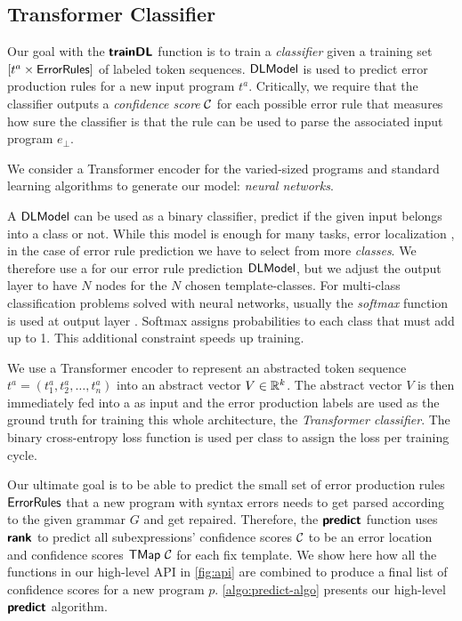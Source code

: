 \subsection{Transformer Classifier}
\label{sec:seq-classifiers:location-rank}

Our goal with the $\bm{\mathsf{trainDL}}$ function is to train a \emph{classifier} given a
training set $[t^a \times \mathsf{ErrorRules}]$ of labeled token sequences.
$\mathsf{DLModel}$ is used to predict error production rules for a new input program
$t^a$. Critically, we require that the classifier outputs a \emph{confidence
score} $\mathcal{C}$ for each possible error rule that measures how sure the
classifier is that the rule can be used to parse the associated input program
$e_{\bot}$.

We consider a Transformer encoder for the varied-sized programs and standard
learning algorithms to generate our model: \emph{neural networks}.

%
A \dnn $\mathsf{DLModel}$ can be used as a binary classifier, \ie predict if the given
input belongs into a class or not. While this model is enough for many tasks,
\eg error localization \citep{Sakkas_2020}, in the case of error rule prediction
we have to select from more \emph{classes}. We therefore use a \dnn for our
error rule prediction $\mathsf{DLModel}$, but we adjust the output layer to have $N$ nodes
for the $N$ chosen template-classes. For multi-class classification problems
solved with neural networks, usually the \emph{softmax} function is used at
output layer \citep{Goodfellow-et-al-2016, Bishop-book-2006}. Softmax assigns
probabilities to each class that must add up to 1. This additional constraint
speeds up training.

%
We use a Transformer encoder to represent an abstracted token sequence $t^a =
(t^a_1, t^a_2, \dots, t^a_n)$ into an abstract vector $V \in \mathbb{R}^k$. The abstract
vector $V$ is then immediately fed into a \dnn as input and the error production
labels are used as the ground truth for training this whole architecture, \ie
the \emph{Transformer classifier}. The binary cross-entropy loss function is
used per class to assign the loss per training cycle.

%
Our ultimate goal is to be able to predict the small set of error production
rules $\mathsf{ErrorRules}$ that a new program with syntax errors needs to get parsed
according to the given grammar $G$ and get repaired. Therefore, the
$\bm{\mathsf{predict}}$ function uses $\bm{\mathsf{rank}}$ to predict all subexpressions' confidence
scores $\mathcal{C}$ to be an error location and confidence scores $\mathsf{TMap}\ \mathcal{C}$ for
each fix template. We show here how all the functions in our high-level API in
\autoref{fig:api} are combined to produce a final list of confidence scores for
a new program $p$. \autoref{algo:predict-algo} presents our high-level
$\bm{\mathsf{predict}}$ algorithm.

